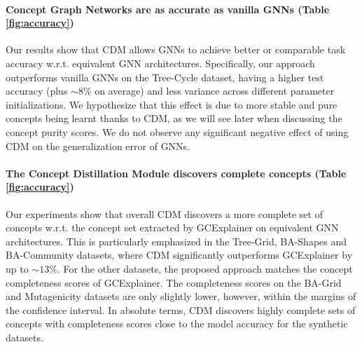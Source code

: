 \documentclass[withindex,glossary]{cam-thesis}
\theoremstyle{plain}
\theoremstyle{definition}
\theoremstyle{remark}
\begin{document}
\paragraph{Concept Graph Networks are as accurate as vanilla GNNs (Table \ref{fig:accuracy})}
Our results show that CDM allows GNNs to achieve better or comparable task accuracy w.r.t. equivalent GNN architectures. Specifically, our approach outperforms vanilla GNNs on the Tree-Cycle dataset, having a higher test accuracy (plus $\sim 8\%$ on average) and less variance across different parameter initializations. We hypothesize that this effect is due to more stable and pure concepts being learnt thanks to CDM, as we will see later when discussing the concept purity scores. We do not observe any significant negative effect of using CDM on the generalization error of GNNs.


\paragraph{The Concept Distillation Module discovers complete concepts (Table \ref{fig:accuracy})}
Our experiments show that overall CDM discovers a more complete set of concepts w.r.t. the concept set extracted by GCExplainer on equivalent GNN architectures. This is particularly emphasized in the Tree-Grid, BA-Shapes and BA-Community datasets, where CDM significantly outperforms GCExplainer by up to $\sim 13\%$. For the other datasets, the proposed approach matches the concept completeness scores of GCExplainer. The completeness scores on the BA-Grid and Mutagenicity datasets are only slightly lower, however, within the margins of the confidence interval. In absolute terms, CDM discovers highly complete sets of concepts with completeness scores close to the model accuracy for the synthetic datasets. 


\end{document}
